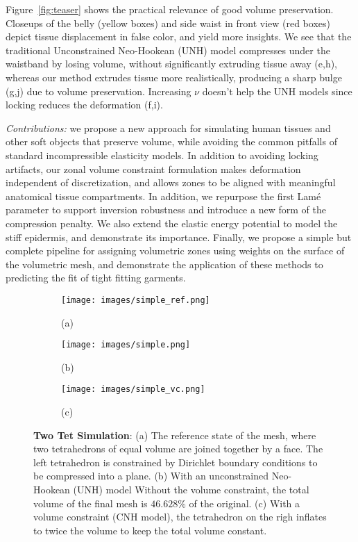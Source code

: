 Figure~\ref{fig:teaser} shows the practical relevance of good volume
preservation.  Closeups of the belly (yellow boxes) and side waist in
front view (red boxes) depict tissue displacement in false color, and
yield more insights. We see that the traditional Unconstrained
Neo-Hookean (UNH) model compresses under the waistband by losing volume,
without significantly extruding tissue away (e,h), whereas our method
extrudes tissue more realistically, producing a sharp bulge (g,j) due to
volume preservation.  Increasing $\nu$ doesn't help the UNH models since
locking reduces the deformation (f,i).

{\em Contributions:} we propose a new approach for simulating human
tissues and other soft objects that preserve volume, while avoiding
the common pitfalls of standard incompressible elasticity models. In
addition to avoiding locking artifacts, our zonal volume constraint
formulation makes deformation independent of discretization, and
allows zones to be aligned with meaningful anatomical tissue
compartments.  In addition, we repurpose the first Lam\'e parameter to
support inversion robustness and introduce a new form of the
compression penalty.  We also extend the elastic energy potential to
model the stiff epidermis, and demonstrate its importance.  Finally,
we propose a simple but complete pipeline for assigning volumetric
zones using weights on the surface of the volumetric mesh, and
demonstrate the application of these methods to predicting the fit of
tight fitting garments.

\begin{figure}[tb]
	\centering
	\begin{subfigure}{.32\linewidth}
		\centering
		\texttt{[image: images/simple\_ref.png]}
		\caption*{(a)}
		\label{sfig:simple_ref}
	\end{subfigure}%
	\begin{subfigure}{.32\linewidth}
		\centering
		\texttt{[image: images/simple.png]}
		\caption*{(b)}
		\label{sfig:simple}
	\end{subfigure}%
	\begin{subfigure}{.32\linewidth}
		\centering
		\texttt{[image: images/simple\_vc.png]}
		\caption*{(c)}
		\label{sfig:simple_vc}
	\end{subfigure}%
	\caption{\textbf{Two Tet Simulation}: (a) The reference state of the mesh, where two
		tetrahedrons of equal volume are joined together by a face. The left tetrahedron is constrained
		by Dirichlet boundary conditions to be compressed into a plane. (b) With an unconstrained Neo-Hookean (UNH) model Without the
		volume constraint, the total volume of the final mesh is $46.628\%$ of the original. (c) With a volume constraint (CNH model), the tetrahedron on the righ inflates to twice
		the volume to keep the total volume constant.
	}
	\label{fig:twotets}
\end{figure} 

